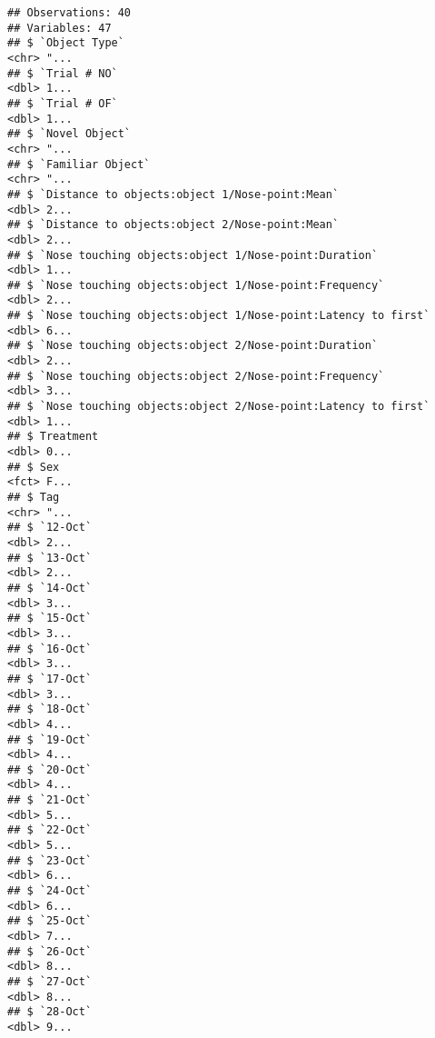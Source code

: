 \documentclass[]{article}
\begin{document}
\begin{verbatim}
## Observations: 40
## Variables: 47
## $ `Object Type`                                                <chr> "...
## $ `Trial # NO`                                                 <dbl> 1...
## $ `Trial # OF`                                                 <dbl> 1...
## $ `Novel Object`                                               <chr> "...
## $ `Familiar Object`                                            <chr> "...
## $ `Distance to objects:object 1/Nose-point:Mean`               <dbl> 2...
## $ `Distance to objects:object 2/Nose-point:Mean`               <dbl> 2...
## $ `Nose touching objects:object 1/Nose-point:Duration`         <dbl> 1...
## $ `Nose touching objects:object 1/Nose-point:Frequency`        <dbl> 2...
## $ `Nose touching objects:object 1/Nose-point:Latency to first` <dbl> 6...
## $ `Nose touching objects:object 2/Nose-point:Duration`         <dbl> 2...
## $ `Nose touching objects:object 2/Nose-point:Frequency`        <dbl> 3...
## $ `Nose touching objects:object 2/Nose-point:Latency to first` <dbl> 1...
## $ Treatment                                                    <dbl> 0...
## $ Sex                                                          <fct> F...
## $ Tag                                                          <chr> "...
## $ `12-Oct`                                                     <dbl> 2...
## $ `13-Oct`                                                     <dbl> 2...
## $ `14-Oct`                                                     <dbl> 3...
## $ `15-Oct`                                                     <dbl> 3...
## $ `16-Oct`                                                     <dbl> 3...
## $ `17-Oct`                                                     <dbl> 3...
## $ `18-Oct`                                                     <dbl> 4...
## $ `19-Oct`                                                     <dbl> 4...
## $ `20-Oct`                                                     <dbl> 4...
## $ `21-Oct`                                                     <dbl> 5...
## $ `22-Oct`                                                     <dbl> 5...
## $ `23-Oct`                                                     <dbl> 6...
## $ `24-Oct`                                                     <dbl> 6...
## $ `25-Oct`                                                     <dbl> 7...
## $ `26-Oct`                                                     <dbl> 8...
## $ `27-Oct`                                                     <dbl> 8...
## $ `28-Oct`                                                     <dbl> 9...

\end{verbatim}
\end{document}
